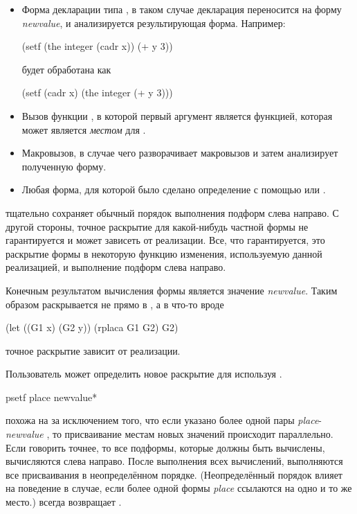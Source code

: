 \begin{defmac}
\begin{itemize}
\item
Форма декларации типа , в таком случае декларация переносится на форму
\emph{newvalue}, и анализируется результирующая  форма. Например:
\begin{lisp}
(setf (the integer (cadr x)) (+ y 3))
\end{lisp}
будет обработана как
\begin{lisp}
(setf (cadr x) (the integer (+ y 3)))
\end{lisp}

\item 
Вызов функции , в которой первый аргумент является функцией, которая
может является \emph{местом} для .

\item 
Макровызов, в случае чего  разворачивает макровызов и затем
анализирует полученную форму.

\item 
Любая форма, для которой было сделано определение с помощью  или
.
\end{itemize}

 тщательно сохраняет обычный порядок выполнения подформ слева
направо.
С другой стороны, точное раскрытие для какой-нибудь частной формы не
гарантируется и может зависеть от реализации. Все, что гарантируется, это 
раскрытие  формы в некоторую функцию изменения, используемую данной
реализацией, и выполнение подформ слева направо.

Конечным результатом вычисления формы  является значение
\emph{newvalue}. Таким образом  раскрывается не прямо в
, а в что-то вроде
\begin{lisp}
(let ((G1 x) (G2 y)) (rplaca G1 G2) G2)
\end{lisp}
точное раскрытие зависит от реализации.

Пользователь может определить новое раскрытие для  используя
.
\end{defmac}

\begin{defmac}
psetf {place newvalue}*

 похожа на  за исключением того, что если указано более одной 
пары
\emph{place}-\emph{newvalue} , то присваивание местам новых значений 
происходит параллельно. Если говорить точнее, то все подформы, которые должны 
быть вычислены, вычисляются слева направо. После выполнения всех вычислений,
выполняются все присваивания в неопределённом порядке.
(Неопределённый порядок влияет на поведение в случае, если более одной формы
\emph{place} ссылаются на одно и то же место.)
 всегда возвращает {\false}.
\end{defmac}

